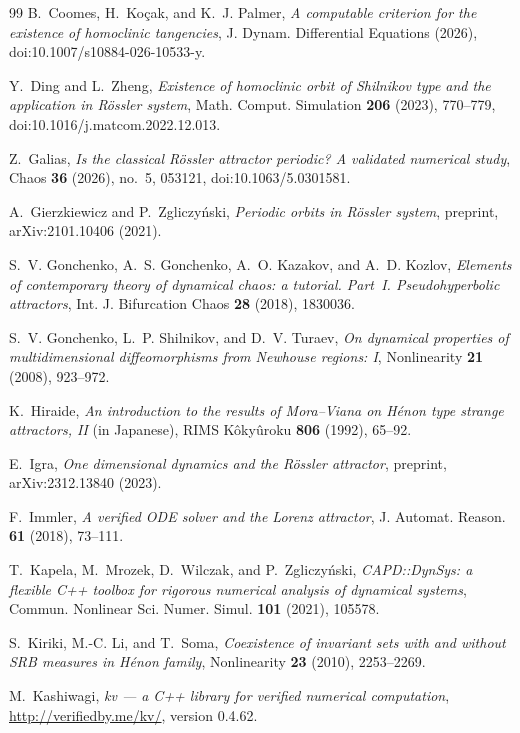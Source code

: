 \documentclass[11pt]{amsart}
\theoremstyle{definition}
\theoremstyle{remark}
\begin{document}
\begin{thebibliography}{99}
B.~Coomes, H.~Ko\c{c}ak, and K.~J. Palmer,
\emph{A computable criterion for the existence of homoclinic tangencies},
J. Dynam. Differential Equations (2026), doi:10.1007/s10884-026-10533-y.

Y.~Ding and L.~Zheng,
\emph{Existence of homoclinic orbit of Shilnikov type and the application in R\"ossler system},
Math. Comput. Simulation \textbf{206} (2023), 770--779, doi:10.1016/j.matcom.2022.12.013.

Z.~Galias,
\emph{Is the classical R\"ossler attractor periodic? A validated numerical study},
Chaos \textbf{36} (2026), no.~5, 053121, doi:10.1063/5.0301581.

A.~Gierzkiewicz and P.~Zgliczy\'nski,
\emph{Periodic orbits in R\"ossler system},
preprint, arXiv:2101.10406 (2021).

S.~V. Gonchenko, A.~S. Gonchenko, A.~O. Kazakov, and A.~D. Kozlov,
\emph{Elements of contemporary theory of dynamical chaos: a tutorial. Part~I. Pseudohyperbolic attractors},
Int. J. Bifurcation Chaos \textbf{28} (2018), 1830036.

S.~V. Gonchenko, L.~P. Shilnikov, and D.~V. Turaev,
\emph{On dynamical properties of multidimensional diffeomorphisms from Newhouse regions: I},
Nonlinearity \textbf{21} (2008), 923--972.

K.~Hiraide,
\emph{An introduction to the results of Mora--Viana on H\'enon type strange attractors, II} (in Japanese),
RIMS K\^oky\^uroku \textbf{806} (1992), 65--92.

E.~Igra,
\emph{One dimensional dynamics and the R\"ossler attractor},
preprint, arXiv:2312.13840 (2023).

F.~Immler,
\emph{A verified ODE solver and the Lorenz attractor},
J. Automat. Reason. \textbf{61} (2018), 73--111.

T.~Kapela, M.~Mrozek, D.~Wilczak, and P.~Zgliczy\'nski,
\emph{CAPD::DynSys: a flexible C++ toolbox for rigorous numerical analysis of dynamical systems},
Commun. Nonlinear Sci. Numer. Simul. \textbf{101} (2021), 105578.

S.~Kiriki, M.-C. Li, and T.~Soma,
\emph{Coexistence of invariant sets with and without SRB measures in H\'enon family},
Nonlinearity \textbf{23} (2010), 2253--2269.

M.~Kashiwagi,
\emph{kv --- a C++ library for verified numerical computation},
\url{http://verifiedby.me/kv/}, version 0.4.62.


\end{thebibliography}
\end{document}
